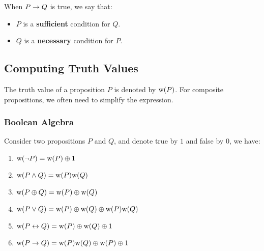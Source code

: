 \begin{definition}
    When $P \rightarrow Q$ is true, we say that:
    \begin{itemize}
        \item $P$ is a \textbf{sufficient} condition for $Q$.
        \item $Q$ is a \textbf{necessary} condition for $P$.
    \end{itemize}
\end{definition}

\subsection{Computing Truth Values}

The truth value of a proposition $P$ is denoted by $\text{w(}P\text{)}$. For composite propositions,
we often need to simplify the expression.

\subsubsection{Boolean Algebra}

\begin{definition}
    Consider two propositions $P$ and $Q$, and denote true by $1$ and false by $0$, we have:
    \begin{multicols}{2}
        \begin{enumerate}
            \item $\text{w(}\neg P\text{)} = \text{w(}P\text{)} \oplus 1$
            \item $\text{w(}P \wedge Q\text{)} = \text{w(}P\text{)}\text{w(}Q\text{)}$
            \item $\text{w(}P \oplus Q\text{)} = \text{w(}P\text{)} \oplus \text{w(}Q\text{)}$
            \item $\text{w(}P \vee Q\text{)} = \text{w(}P\text{)} \oplus \text{w(}Q\text{)} \oplus \text{w(}P\text{)}\text{w(}Q\text{)}$
            \item $\text{w(}P \leftrightarrow Q\text{)} = \text{w(}P\text{)} \oplus \text{w(}Q\text{)} \oplus 1$
            \item $\text{w(}P \rightarrow Q\text{)} = \text{w(}P\text{)}\text{w(}Q\text{)} \oplus \text{w(}P\text{)} \oplus 1$
        \end{enumerate}
    \end{multicols}
\end{definition}

